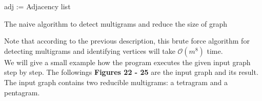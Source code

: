 \begin{algorithm}[H]
\DontPrintSemicolon
  adj := Adjacency list \\
    { 
    }
\caption{The naive algorithm to detect multigrams and reduce the size of graph}
\end{algorithm}
Note that according to the previous description, this brute force algorithm for detecting multigrams and identifying vertices will take $\mathcal{O}(m^8)$
 time.\\
 
 We will give a small example how the program executes the given input graph step by step. The followings \textbf{Figures 22 - 25} are the input graph and its result. The input graph contains two reducible multigrams: a tetragram and a pentagram.

